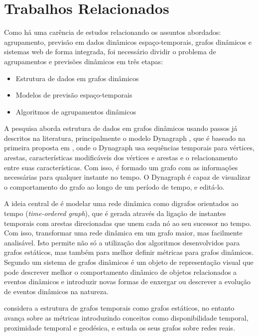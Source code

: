 \section{Trabalhos Relacionados}

Como há uma carência de estudos relacionando os assuntos abordados: agrupamento,
previsão em dados dinâmicos espaço-temporais, grafos dinâmicos e sistemas web
de forma integrada, foi necessário dividir o problema de agrupamentos e previsões dinâmicos em três etapas:
\begin{itemize}
\item Estrutura de dados em grafos dinâmicos
\item Modelos de previsão espaço-temporais
\item Algoritmos de agrupamentos dinâmicos
\end{itemize}

A pesquisa aborda estrutura de dados em grafos dinâmicos usando passos já descritos na literatura,
principalmente o modelo Dynagraph \cite{dynagraph}, que é baseado na primeira proposta
em \cite{dynagraph2012}, onde o Dynagraph usa sequências temporais para vértices, arestas,
características modificáveis dos vértices e arestas e o relacionamento entre suas características.
Com isso, é formado um grafo com as informações necessárias para qualquer instante no tempo.
O Dynagraph é capaz de visualizar o comportamento do grafo ao longo de um período de tempo,
e editá-lo.

A ideia central de \cite{kim} é modelar uma rede dinâmica como digrafos orientados ao
tempo (\textit{time-ordered graph}), que é gerada através da ligação de instantes temporais com arestas
direcionadas que unem cada nó ao seu sucessor no tempo. Com isso, transformar uma rede dinâmica
em um grafo maior, mas facilmente analisável. Isto permite não só a utilização dos algoritmos 
desenvolvidos para grafos estáticos, mas também para melhor definir métricas para grafos dinâmicos.
Segundo \cite{kim} um sistema de grafos dinâmicos é um objeto de representação visual
que pode descrever melhor o comportamento dinâmico de objetos relacionados a eventos dinâmicos e
introduzir novas formas de enxergar ou descrever a evolução de eventos dinâmicos na natureza.

\cite{kostakos} considera a estrutura de grafos temporais como grafos
estáticos, no entanto avança sobre as métricas introduzindo conceitos como disponibilidade
temporal, proximidade temporal e geodésica, e estuda os seus grafos sobre redes reais.

